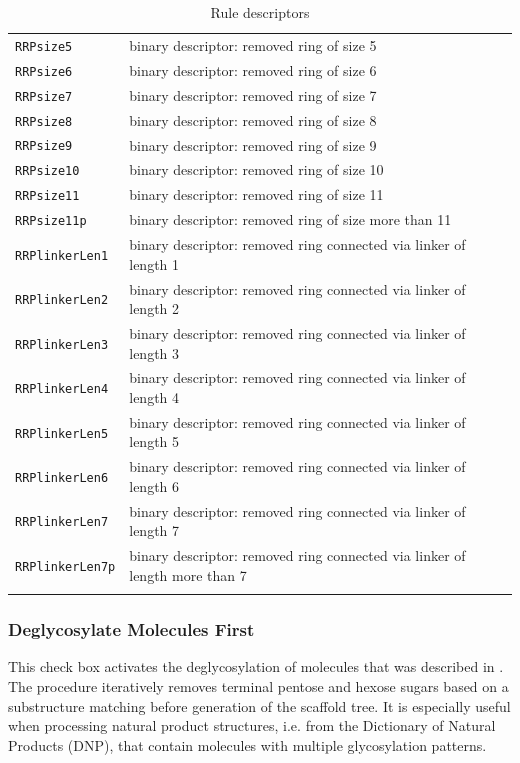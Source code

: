 \begin{longtable}{lp{}}
\texttt{RRPsize5}		& binary descriptor: removed ring of size 5 \\
\texttt{RRPsize6}		& binary descriptor: removed ring of size 6 \\
\texttt{RRPsize7}		& binary descriptor: removed ring of size 7 \\
\texttt{RRPsize8}		& binary descriptor: removed ring of size 8 \\
\texttt{RRPsize9}		& binary descriptor: removed ring of size 9 \\
\texttt{RRPsize10}		& binary descriptor: removed ring of size 10 \\
\texttt{RRPsize11}		& binary descriptor: removed ring of size 11 \\
\texttt{RRPsize11p}		& binary descriptor: removed ring of size more than 11 \\
\texttt{RRPlinkerLen1}		& binary descriptor: removed ring connected via linker of length 1 \\
\texttt{RRPlinkerLen2}		& binary descriptor: removed ring connected via linker of length 2 \\
\texttt{RRPlinkerLen3}		& binary descriptor: removed ring connected via linker of length 3 \\
\texttt{RRPlinkerLen4}		& binary descriptor: removed ring connected via linker of length 4 \\
\texttt{RRPlinkerLen5}		& binary descriptor: removed ring connected via linker of length 5 \\
\texttt{RRPlinkerLen6}		& binary descriptor: removed ring connected via linker of length 6 \\
\texttt{RRPlinkerLen7}		& binary descriptor: removed ring connected via linker of length 7 \\
\texttt{RRPlinkerLen7p}		& binary descriptor: removed ring connected via linker of length more than 7 \\
\bottomrule
\caption{Rule descriptors}
\end{longtable}

\subsubsection{Deglycosylate Molecules First} \label{subsec:scaffoldhunter:deglycosylate}
This check box activates the deglycosylation of molecules that was described in \cite{Koch2005}. 
The procedure iteratively removes terminal pentose and hexose sugars based on a substructure matching before generation of the scaffold 
tree. It is especially useful when processing natural product structures, i.e. from the Dictionary of Natural Products (DNP), that 
contain molecules with multiple glycosylation patterns.
